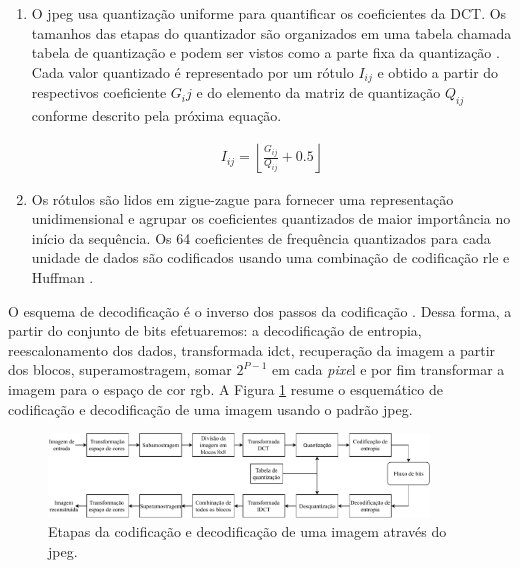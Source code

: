 \begin{enumerate}
	\item O \acrshort{jpeg} usa quantização uniforme para quantificar os coeficientes da DCT. Os tamanhos das etapas do quantizador são organizados em uma tabela chamada tabela de quantização e podem ser vistos como a parte fixa da quantização \cite{sayood2017introduction}. 
	Cada valor quantizado é representado por um rótulo $I_{ij}$ e obtido a partir do respectivos coeficiente $G_ij$ e do elemento da matriz de quantização $Q_{ij}$ conforme descrito pela próxima equação. 
	
	\begin{equation}
	\begin{aligned}
	I_{ij} = \left \lfloor \frac{G_{ij}}{Q_{ij}} +0.5  \right \rfloor 
	\end{aligned}
	\end{equation}
	
	\item Os rótulos são lidos em zigue-zague para fornecer uma representação unidimensional e agrupar os coeficientes quantizados de maior importância no início da sequência. 
	Os 64 coeficientes de frequência quantizados para cada unidade de dados são codificados usando uma combinação de codificação \gls{rle} e Huffman \cite{salomon2007data}. 
	
\end{enumerate}  
O esquema de decodificação é o inverso dos passos da codificação \cite{sayood2017introduction}. Dessa forma, a partir do conjunto de bits efetuaremos: a decodificação de entropia, reescalonamento dos dados, transformada \acrshort{idct}, recuperação da imagem a partir dos blocos, superamostragem, somar $2^{P-1}$ em cada \textit{pixe}l e por fim transformar a imagem para o espaço de cor \acrshort{rgb}. A Figura \ref{fig:jpeg} resume o esquemático de codificação e decodificação de uma imagem usando o padrão \acrshort{jpeg}.


\begin{figure}[h]
	\centering
	\includegraphics[width=0.9\textwidth]{figuras/jpeg.pdf}
	\caption[Padrão \acrshort{jpeg}]{Etapas da codificação e decodificação de uma imagem através do \acrshort{jpeg}.}
	\label{fig:jpeg}
\end{figure}


